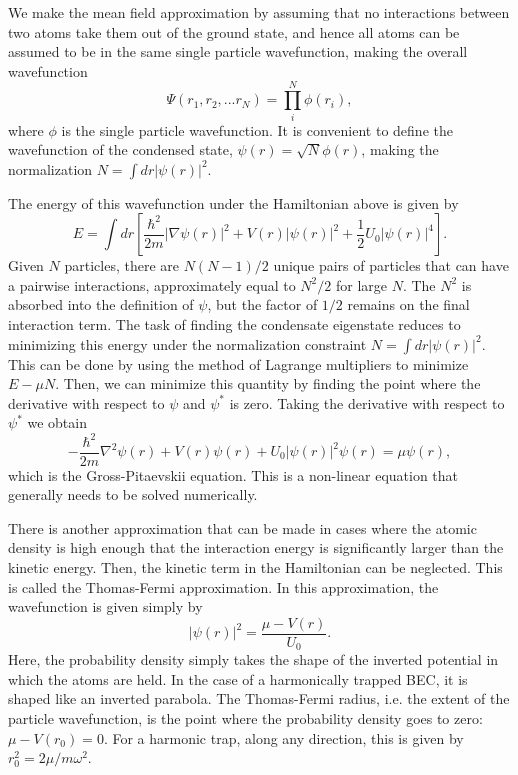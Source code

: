 We make the mean field approximation by assuming that no interactions between two atoms take them out of the ground state, and hence all atoms can be assumed to be in the same single particle wavefunction, making the overall wavefunction
\begin{equation}
\Psi(r_1,r_2,...r_N)=\prod_i^N \phi(r_i),
\end{equation}
where $\phi$ is the single particle wavefunction. It is convenient to define the wavefunction of the condensed state, $\psi(r) = \sqrt{N}\phi(r)$, making the normalization $N=\int dr |\psi(r)|^2$.

The energy of this wavefunction under the Hamiltonian above is given by
\begin{equation}
E=\int dr\left[ \frac{\hbar^2}{2m}|\nabla\psi(r)|^2 + V(r)|\psi(r)|^2 + \frac{1}{2}U_0|\psi(r)|^4\right].
\end{equation}
Given $N$ particles, there are $N(N-1)/2$ unique pairs of particles that can have a pairwise interactions, approximately equal to $N^2/2$ for large $N$. The $N^2$ is absorbed into the definition of $\psi$, but the factor of $1/2$ remains on the final interaction term. The task of finding the condensate eigenstate reduces to minimizing this energy under the normalization constraint $N=\int dr |\psi(r)|^2$. This can be done by using the method of Lagrange multipliers to minimize $E-\mu N$. Then, we can minimize this quantity by finding the point where the derivative with respect to $\psi$ and $\psi^*$ is zero. Taking the derivative with respect to $\psi^*$ we obtain 
\begin{equation}
-\frac{\hbar^2}{2m} \nabla^2 \psi(r) + V(r)\psi(r) + U_0 |\psi(r)|^2\psi(r) = \mu \psi(r),
\end{equation}
which is the Gross-Pitaevskii equation. This is a non-linear equation that generally needs to be solved numerically.

There is another approximation that can be made in cases where the atomic density is high enough that the interaction energy is significantly larger than the kinetic energy. Then, the kinetic term in the Hamiltonian can be neglected. This is called the Thomas-Fermi approximation. In this approximation, the wavefunction is given simply by
\begin{equation}
|\psi(r)|^2 = \frac{\mu - V(r)}{U_0}.
\end{equation}
Here, the probability density simply takes the shape of the inverted potential in which the atoms are held. In the case of a harmonically trapped BEC, it is shaped like an inverted parabola. The Thomas-Fermi radius, i.e. the extent of the particle wavefunction, is the point where the probability density goes to zero: $\mu - V(r_0) = 0$. For a harmonic trap, along any direction, this is given by $r_0^2 = 2\mu/m\omega^2$. 

